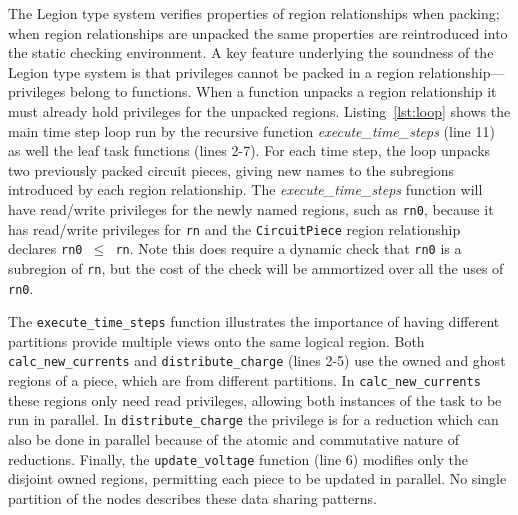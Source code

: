 The Legion type system verifies properties of region relationships when packing;
when region relationships are unpacked the same properties are
reintroduced into the static checking environment.
A key feature underlying the soundness of the Legion
type system is that privileges cannot be packed in a region
relationship---privileges belong to functions. When a function unpacks
a region relationship it must already hold privileges for the unpacked regions.
Listing~\ref{lst:loop} shows the main time step loop run by the 
recursive function {\em execute\_time\_steps} (line 11)
as well the leaf task functions (lines 2-7).  
For each time step, the loop unpacks 
two previously packed circuit pieces, giving new names to the subregions introduced
by each region relationship.  The {\em execute\_time\_steps} function
will have read/write privileges for the newly named regions, such as {\tt rn0},
because it has read/write privileges for {\tt rn} and the {\tt CircuitPiece} 
region relationship declares {\tt rn0 $\leq$ rn}.  Note this does require
a dynamic check that {\tt rn0} is a subregion of {\tt rn}, but the cost of the 
check will be ammortized over all the uses of {\tt rn0}.

The {\tt execute\_time\_steps} function   
illustrates the importance of having different partitions provide 
multiple views onto the same logical region.  Both {\tt calc\_new\_currents} 
and {\tt distribute\_charge} (lines 2-5)
use the owned and ghost regions of a piece, which are from different partitions. In
{\tt calc\_new\_currents} these regions only need read
privileges, allowing both instances of the task to be
run in parallel.  In {\tt distribute\_charge} the
privilege is for a reduction which can also be done in parallel
because of the atomic and commutative nature of reductions.  Finally,
the {\tt update\_voltage} function (line 6) modifies only the disjoint owned regions, 
permitting each piece to be updated in parallel.  No single partition of the nodes
describes these data sharing patterns.

